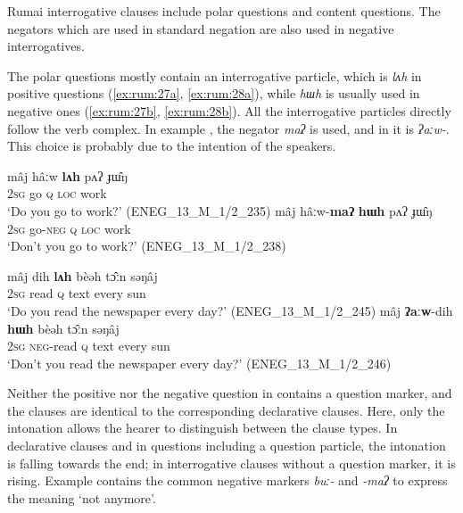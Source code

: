 \documentclass[output=paper,colorlinks,citecolor=brown]{langscibook}
\begin{document}
Rumai interrogative clauses include polar questions and content questions. The negators which are used in standard negation are also used in negative interrogatives.

The polar questions mostly contain an interrogative particle, which is \textit{lʌh} in positive questions (\ref{ex:rum:27a}, \ref{ex:rum:28a}), while \textit{hɯh} is usually used in negative ones (\ref{ex:rum:27b}, \ref{ex:rum:28b}). All the interrogative particles directly follow the verb complex. In example , the negator \textit{maʔ} is used, and in  it is \textit{ʔaːw-}. This choice is probably due to the intention of the speakers.

\ea\label{ex:rum:27}
    \ea\label{ex:rum:27a}
        \gll mâj	hâːw	\textbf{lʌh}	pʌʔ	ɟɯ̂ŋ \\ 
             2\textsc{sg} go \textsc{q} \textsc{loc} work \\
        \glt ‘Do you go to work?’ (ENEG\_13\_M\_1/2\_235)
    \ex\label{ex:rum:27b}
        \gll mâj	hâːw-\textbf{maʔ}	\textbf{hɯh}	pʌʔ	ɟɯ̂ŋ \\
             \textsc{2sg} go-\textsc{neg} \textsc{q} \textsc{loc} work \\
        \glt ‘Don’t you go to work?’ (ENEG\_13\_M\_1/2\_238)
    \z
\z 

\ea\label{ex:rum:28}
    \ea\label{ex:rum:28a}
        \gll mâj	dih	\textbf{lʌh}	bèəh	tɔ̂ːn	səŋâj \\ 
             2\textsc{sg} read \textsc{q} text every sun \\
        \glt ‘Do you read the newspaper every day?’ (ENEG\_13\_M\_1/2\_245)
    \ex\label{ex:rum:28b}
        \gll mâj	\textbf{ʔaːw}-dih	\textbf{hɯh}	bèəh	tɔ̂ːn	səŋâj \\
             2\textsc{sg} \textsc{neg-}read \textsc{q} text every sun \\
        \glt ‘Don’t you read the newspaper every day?’ (ENEG\_13\_M\_1/2\_246)
    \z
\z 

Neither the positive nor the negative question in  contains a question marker, and the clauses are identical to the corresponding declarative clauses. Here, only the intonation allows the hearer to distinguish between the clause types. In declarative clauses and in questions including a question particle, the intonation is falling towards the end; in interrogative clauses without a question marker, it is rising.
Example  contains the common negative markers \textit{buː-} and \textit{{}-maʔ} to express the meaning ‘not anymore’.
\end{document}
